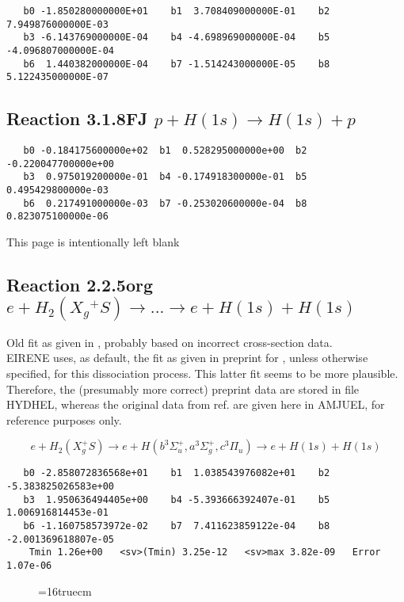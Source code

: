 \documentclass[12pt,dvipdfmx]{article}
\begin{document}
\begin{small}\begin{verbatim}
   b0 -1.850280000000E+01    b1  3.708409000000E-01    b2  7.949876000000E-03
   b3 -6.143769000000E-04    b4 -4.698969000000E-04    b5 -4.096807000000E-04
   b6  1.440382000000E-04    b7 -1.514243000000E-05    b8  5.122435000000E-07
\end{verbatim}\end{small}

\subsection{
Reaction 3.1.8FJ  $p + H(1s) \rightarrow H(1s) + p  $
}


\begin{small}\begin{verbatim}
   b0 -0.184175600000e+02  b1  0.528295000000e+00  b2 -0.220047700000e+00
   b3  0.975019200000e-01  b4 -0.174918300000e-01  b5  0.495429800000e-03
   b6  0.217491000000e-03  b7 -0.253020600000e-04  b8  0.823075100000e-06
\end{verbatim}\end{small}

\newpage
This page is intentionally left blank
\newpage


\subsection{
Reaction 2.2.5org
$e + H_2(X_g\!^+ S ) \rightarrow . . .\rightarrow e + H(1s) + H(1s)$}


Old fit as given in \cite{kn:Janev}, probably based on incorrect cross-section data.\\
      EIRENE uses, as default, the fit as given in preprint for \cite{kn:Janev},
      unless otherwise specified, for this dissociation process.
      This latter fit seems to be more plausible. Therefore, the
      (presumably more correct) preprint data are stored in file HYDHEL,
      whereas the original data from ref.\cite{kn:Janev} are given here in AMJUEL,
      for reference purposes only.



\begin{displaymath}
 e + H_2(X_g^+ S) \rightarrow e + H(b^3\Sigma^+_u , a^3\Sigma^+_g,
c^3\Pi_u)
             \rightarrow e + H(1s) + H(1s)
\end{displaymath}



\begin{small}\begin{verbatim}
   b0 -2.858072836568e+01    b1  1.038543976082e+01    b2 -5.383825026583e+00
   b3  1.950636494405e+00    b4 -5.393666392407e-01    b5  1.006916814453e-01
   b6 -1.160758573972e-02    b7  7.411623859122e-04    b8 -2.001369618807e-05
    Tmin 1.26e+00   <sv>(Tmin) 3.25e-12   <sv>max 3.82e-09   Error 1.07e-06
\end{verbatim}\end{small}
\begin{figure} \label{2.2.5.or}
\epsfxsize=16truecm
\end{figure}
\end{document}
